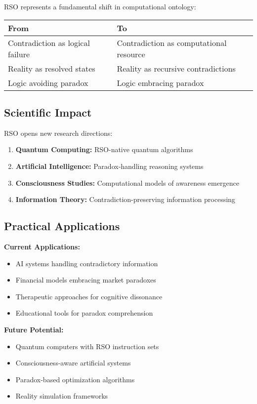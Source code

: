 \documentclass[11pt,a4paper]{article}
\begin{document}
RSO represents a fundamental shift in computational ontology:

\begin{center}
\begin{tabular}{p{}p{}}
\toprule
\textbf{From} & \textbf{To} \\
\midrule
Contradiction as logical failure & Contradiction as computational resource \\
Reality as resolved states & Reality as recursive contradictions \\
Logic avoiding paradox & Logic embracing paradox \\
\bottomrule
\end{tabular}
\end{center}

\subsection{Scientific Impact}

RSO opens new research directions:

\begin{enumerate}
    \item \textbf{Quantum Computing:} RSO-native quantum algorithms
    \item \textbf{Artificial Intelligence:} Paradox-handling reasoning systems
    \item \textbf{Consciousness Studies:} Computational models of awareness emergence
    \item \textbf{Information Theory:} Contradiction-preserving information processing
\end{enumerate}

\subsection{Practical Applications}

\textbf{Current Applications:}
\begin{itemize}
    \item AI systems handling contradictory information
    \item Financial models embracing market paradoxes
    \item Therapeutic approaches for cognitive dissonance
    \item Educational tools for paradox comprehension
\end{itemize}

\textbf{Future Potential:}
\begin{itemize}
    \item Quantum computers with RSO instruction sets
    \item Consciousness-aware artificial systems
    \item Paradox-based optimization algorithms
    \item Reality simulation frameworks
\end{itemize}
\end{document}
